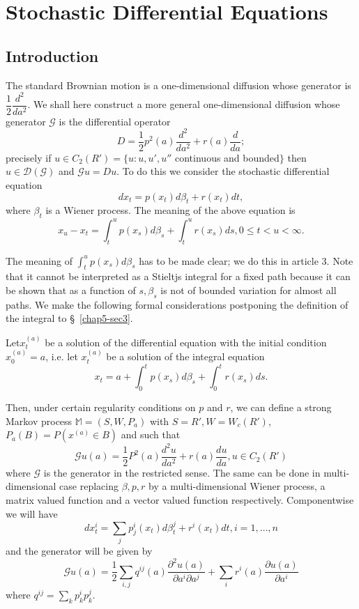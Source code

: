\chapter{Stochastic Differential Equations}%

\section{Introduction}\label{chap5-sec1}\pageoriginale 

The standard Brownian motion is a one-dimensional diffusion whose
generator is $\dfrac{1}{2} \dfrac{d^2}{da^2}$. We shall here construct
a more general one-dimen\-sional diffusion whose generator $\mathscr{G}$
is the differential operator  
$$
D = \frac{1}{2}p^2 (a) \frac{d^2}{da^2} + r(a) \frac{d}{da};
$$
precisely if $u \in C_2 (R') = \{u: u, u', u''$ continuous and 
bounded$\}$ then $u \in \mathscr{D}(\mathscr{G})$ and $\mathscr{G} u =
Du$. To do this we consider the stochastic differential equation  
$$
dx_t = p(x_t) d \beta_t + r(x_t) dt,
$$
where $\beta_t$ is a Wiener process. The meaning of the above equation is 
$$
x_u - x_t = \int^u_t p(x_s) d \beta_s + \int^u_t r(x_s)ds, 0 \leq t <
u < \infty. 
$$

The meaning of $\int^u_t p(x_s) d \beta_s $ has to be made clear; we
do this in article 3. Note that it cannot be interpreted as a Stieltjs
integral for a fixed path because it can be shown that as a function
of $s, \beta_s$ is not of bounded variation for almost all paths. We
make the following formal considerations postponing the definition of
the integral to \S\ \ref{chap5-sec3}. 

Let\pageoriginale $x_t^{(a)}$ be a solution of the differential
equation with the 
initial condition $x^{(a)}_0 = a$, i.e. let $x_t^{(a)}$ be a solution
of the integral equation 
$$
x_t = a + \int^t_0 p(x_s) d \beta_s + \int^t_0 r(x_s) ds.
$$

Then, under certain regularity conditions on $p$ and $r$, we can
define a strong Markov process $\mathbb{M} = (S, W, P_a)$ with $S =
R', W = W_c (R')$,\break $P_a(B) = P(x^{(a)} \in B)$ and such that  
$$
\mathscr{G} u(a) = \frac{1}{2} P^2 (a) \frac{d^2u}{da^2} + r(a)
\frac{du}{da}, u \in C_2 (R') 
$$
where $\mathscr{G}$ is the generator in the restricted sense. The same
can be done in multi-dimensional case replacing $\beta , p, r$ by a
multi-dimensional Wiener process, a matrix valued function and a
vector valued function respectively. Componentwise we will have  
$$
dx^i_t = \sum_j p^i_j (x_t) d \beta^j_t + r^i (x_t) dt, i = 1, \ldots, n
$$
and the generator will be given by  
$$
\mathscr{G} u(a) = \frac{1}{2} \sum_{i, j} q^{ij}(a) \frac{\partial^2
  u (a)}{\partial a^i \partial a^j} + \sum_i r^i (a) \frac{\partial u
  (a)}{\partial a^i} 
$$ 
where $q^{ij} = \sum\limits_k p^i_k p^j_k$.


